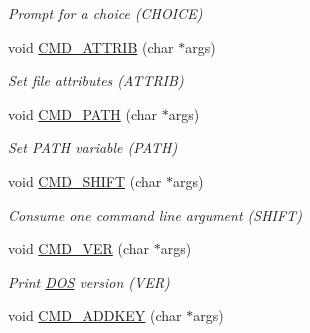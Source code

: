 \begin{DoxyCompactItemize}
\begin{DoxyCompactList}\small\item\em Prompt for a choice (C\-H\-O\-I\-C\-E) \end{DoxyCompactList}\item 
\hypertarget{classDOS__Shell_a98658a3e13ac8476c4c2bdd8b481de13}{void \hyperlink{classDOS__Shell_a98658a3e13ac8476c4c2bdd8b481de13}{C\-M\-D\-\_\-\-A\-T\-T\-R\-I\-B} (char $\ast$args)}\label{classDOS__Shell_a98658a3e13ac8476c4c2bdd8b481de13}

\begin{DoxyCompactList}\small\item\em Set file attributes (A\-T\-T\-R\-I\-B) \end{DoxyCompactList}\item 
\hypertarget{classDOS__Shell_a53558bb0585808e6f894f33fbb582058}{void \hyperlink{classDOS__Shell_a53558bb0585808e6f894f33fbb582058}{C\-M\-D\-\_\-\-P\-A\-T\-H} (char $\ast$args)}\label{classDOS__Shell_a53558bb0585808e6f894f33fbb582058}

\begin{DoxyCompactList}\small\item\em Set P\-A\-T\-H variable (P\-A\-T\-H) \end{DoxyCompactList}\item 
\hypertarget{classDOS__Shell_a44cd9147b18559ae2377e0255c4784e9}{void \hyperlink{classDOS__Shell_a44cd9147b18559ae2377e0255c4784e9}{C\-M\-D\-\_\-\-S\-H\-I\-F\-T} (char $\ast$args)}\label{classDOS__Shell_a44cd9147b18559ae2377e0255c4784e9}

\begin{DoxyCompactList}\small\item\em Consume one command line argument (S\-H\-I\-F\-T) \end{DoxyCompactList}\item 
\hypertarget{classDOS__Shell_ac9dfaa8312e2a2df60ba39cb1c4bd46a}{void \hyperlink{classDOS__Shell_ac9dfaa8312e2a2df60ba39cb1c4bd46a}{C\-M\-D\-\_\-\-V\-E\-R} (char $\ast$args)}\label{classDOS__Shell_ac9dfaa8312e2a2df60ba39cb1c4bd46a}

\begin{DoxyCompactList}\small\item\em Print \hyperlink{classDOS}{D\-O\-S} version (V\-E\-R) \end{DoxyCompactList}\item 
\hypertarget{classDOS__Shell_a655bd9d7fd3f518861ed96332ef5b10c}{void \hyperlink{classDOS__Shell_a655bd9d7fd3f518861ed96332ef5b10c}{C\-M\-D\-\_\-\-A\-D\-D\-K\-E\-Y} (char $\ast$args)}\label{classDOS__Shell_a655bd9d7fd3f518861ed96332ef5b10c}


\end{DoxyCompactItemize}
